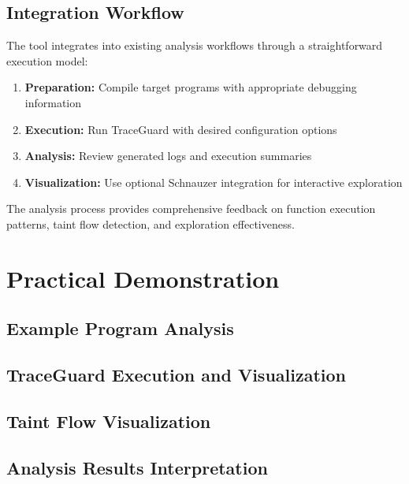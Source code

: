 \subsection{Integration Workflow}

The tool integrates into existing analysis workflows through a straightforward execution model:

\begin{enumerate}
    \item \textbf{Preparation:} Compile target programs with appropriate debugging information
    \item \textbf{Execution:} Run TraceGuard with desired configuration options
    \item \textbf{Analysis:} Review generated logs and execution summaries
    \item \textbf{Visualization:} Use optional Schnauzer integration for interactive exploration
\end{enumerate}

The analysis process provides comprehensive feedback on function execution patterns, taint flow detection, and exploration effectiveness.

\section{Practical Demonstration}\label{sec:practical_demonstration}

\subsection{Example Program Analysis}

\subsection{TraceGuard Execution and Visualization}

\subsection{Taint Flow Visualization}

\subsection{Analysis Results Interpretation}
